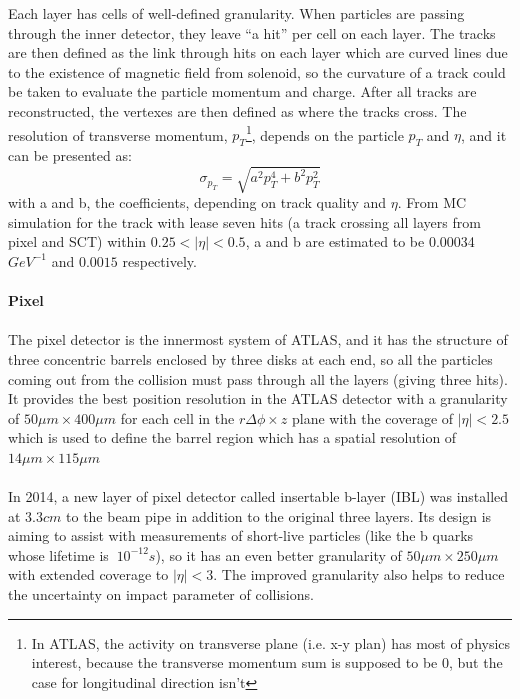Each layer has cells of well-defined granularity. When particles are passing through the inner detector, they leave ``a hit'' per cell on each layer. The tracks are then defined as the link through hits on each layer which are curved lines due to the existence of magnetic field from solenoid, so the curvature of a track could be taken to evaluate the particle momentum and charge. After all tracks are reconstructed, the vertexes are then defined as where the tracks cross. The resolution of transverse momentum, $p_{T}$\footnote{In ATLAS, the activity on transverse plane (i.e. x-y plan) has most of physics interest, because the transverse momentum sum is supposed to be 0, but the case for longitudinal direction isn't}, depends on the particle $p_{T}$ and $\eta$, and it can be presented as:
\begin{equation}
\sigma_{p_{T}} = \sqrt{a^{2}p_{T}^{4}+b^{2}p_{T}^{2}}
\end{equation}
with a and b, the coefficients, depending on track quality and $\eta$. From MC simulation for the track with lease seven hits (a track crossing all layers from pixel and SCT) within $0.25<|\eta|<0.5$, a and b are estimated to be 0.00034 $GeV^{-1}$ and $0.0015$ respectively.
\\
\\{\bf Pixel\cite{Collaboration:2285585}}
\\
\\The pixel detector is the innermost system of ATLAS, and it has the structure of three concentric barrels enclosed by three disks at each end, so all the particles coming out from the collision must pass through all the layers (giving three hits). It provides the best position resolution in the ATLAS detector with a granularity of $50\mu m\times 400\mu m$  for each cell in the $r\Delta \phi \times z$ plane with the coverage of $|\eta|<2.5$ which is used to define the barrel region which has a spatial resolution of $14\mu m\times 115\mu m$
\\
\\In 2014, a new layer of pixel detector called insertable b-layer (IBL) \cite{Miucci_2014} was installed at $3.3cm$ to the beam pipe in addition to the original three layers. Its design is aiming to assist with measurements of short-live particles (like the b quarks whose lifetime is $~10^{-12}s$), so it has an even better granularity of $50\mu m\times 250\mu m$ with extended coverage to $|\eta|<3$. The improved granularity also helps to reduce the uncertainty on impact parameter of collisions.
\\
